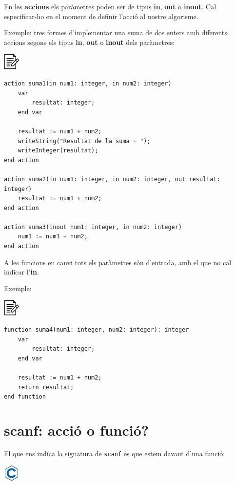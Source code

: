 \documentclass[]{book}
\begin{document}
En les \textbf{accions} els paràmetres poden ser de tipus \textbf{in},
\textbf{out} o \textbf{inout}. Cal especificar-ho en el moment de
definir l'acció al nostre algorisme.

Exemple: tres formes d'implementar una suma de dos enters amb diferents
accions segons els tipus \textbf{in}, \textbf{out} o \textbf{inout} dels
paràmetres:

\includegraphics{./img/alg.png}

\begin{verbatim}
action suma1(in num1: integer, in num2: integer)
    var
        resultat: integer;
    end var

    resultat := num1 + num2;
    writeString("Resultat de la suma = ");
    writeInteger(resultat);
end action

action suma2(in num1: integer, in num2: integer, out resultat: integer)
    resultat := num1 + num2;
end action

action suma3(inout num1: integer, in num2: integer)
    num1 := num1 + num2;
end action
\end{verbatim}

A les funcions en canvi tots els paràmetres són d'entrada, amb el que no
cal indicar l'\textbf{in}.

Exemple:

\includegraphics{./img/alg.png}

\begin{verbatim}
function suma4(num1: integer, num2: integer): integer
    var
        resultat: integer;
    end var

    resultat := num1 + num2;
    return resultat;
end function
\end{verbatim}

\section{scanf: acció o funció?}\label{scanf-accio-o-funcio}

El que ens indica la signatura de \texttt{scanf} és que estem davant
d'una funció:

\includegraphics{./img/c.png}
\end{document}
